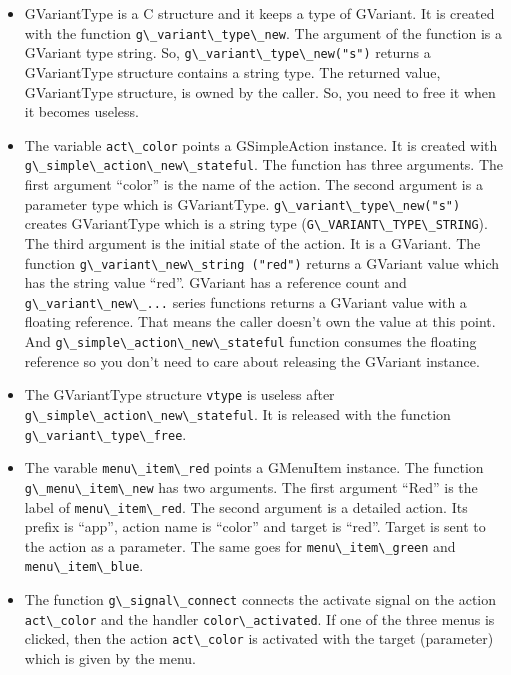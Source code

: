 \begin{itemize}
\tightlist
\item
  GVariantType is a C structure and it keeps a type of GVariant. It is
  created with the function
  \passthrough{\lstinline!g\_variant\_type\_new!}. The argument of the
  function is a GVariant type string. So,
  \passthrough{\lstinline!g\_variant\_type\_new("s")!} returns a
  GVariantType structure contains a string type. The returned value,
  GVariantType structure, is owned by the caller. So, you need to free
  it when it becomes useless.
\item
  The variable \passthrough{\lstinline!act\_color!} points a
  GSimpleAction instance. It is created with
  \passthrough{\lstinline!g\_simple\_action\_new\_stateful!}. The
  function has three arguments. The first argument ``color'' is the name
  of the action. The second argument is a parameter type which is
  GVariantType. \passthrough{\lstinline!g\_variant\_type\_new("s")!}
  creates GVariantType which is a string type
  (\passthrough{\lstinline!G\_VARIANT\_TYPE\_STRING!}). The third
  argument is the initial state of the action. It is a GVariant. The
  function \passthrough{\lstinline!g\_variant\_new\_string ("red")!}
  returns a GVariant value which has the string value ``red''. GVariant
  has a reference count and
  \passthrough{\lstinline!g\_variant\_new\_...!} series functions
  returns a GVariant value with a floating reference. That means the
  caller doesn't own the value at this point. And
  \passthrough{\lstinline!g\_simple\_action\_new\_stateful!} function
  consumes the floating reference so you don't need to care about
  releasing the GVariant instance.
\item
  The GVariantType structure \passthrough{\lstinline!vtype!} is useless
  after \passthrough{\lstinline!g\_simple\_action\_new\_stateful!}. It
  is released with the function
  \passthrough{\lstinline!g\_variant\_type\_free!}.
\item
  The varable \passthrough{\lstinline!menu\_item\_red!} points a
  GMenuItem instance. The function
  \passthrough{\lstinline!g\_menu\_item\_new!} has two arguments. The
  first argument ``Red'' is the label of
  \passthrough{\lstinline!menu\_item\_red!}. The second argument is a
  detailed action. Its prefix is ``app'', action name is ``color'' and
  target is ``red''. Target is sent to the action as a parameter. The
  same goes for \passthrough{\lstinline!menu\_item\_green!} and
  \passthrough{\lstinline!menu\_item\_blue!}.
\item
  The function \passthrough{\lstinline!g\_signal\_connect!} connects the
  activate signal on the action \passthrough{\lstinline!act\_color!} and
  the handler \passthrough{\lstinline!color\_activated!}. If one of the
  three menus is clicked, then the action
  \passthrough{\lstinline!act\_color!} is activated with the target
  (parameter) which is given by the menu.
\end{itemize}

